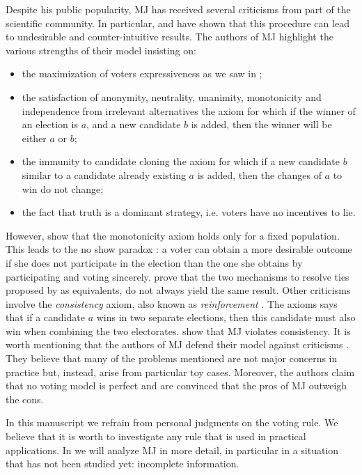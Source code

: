 Despite his public popularity, \ac{MJ} has received several criticisms from part of the scientific community. In particular, \citet{Felsenthal2008, Zahid2009} and \citet{Laslier2018} have shown that this procedure can lead to undesirable and counter-intuitive results.
The authors of \ac{MJ} highlight the various strengths of their model insisting on:
\begin{itemize}
	\item the maximization of voters expressiveness \textemdash as we saw in ;
	\item the satisfaction of anonymity, neutrality, unanimity, monotonicity and independence from irrelevant alternatives \textemdash the axiom for which if the winner of an election is $a$, and a new candidate $b$ is added, then the winner will be either $a$ or $b$;
	\item the immunity to candidate cloning \textemdash the axiom for which if a new candidate $b$ similar to a candidate already existing $a$ is added, then the changes of $a$ to win do not change;
	\item the fact that truth is a dominant strategy, i.e. voters have no incentives to lie. 
\end{itemize}

However, \citet{Felsenthal2008,Laslier2018} show that the monotonicity axiom holds only for a fixed population. This leads to the no show paradox \citep{Fishburn1983}: a voter can obtain a more desirable outcome if she does not participate in the election than the one she obtains by participating and voting sincerely. 
\citet{Felsenthal2008,Zahid2009} prove that the two mechanisms to resolve ties proposed by \citet{Balinski2011} as equivalents, do not always yield the same result. 
Other criticisms involve the \textit{consistency} axiom, also known as \textit{reinforcement} \citep{Young1974,Young1975}. The axioms says that if a candidate $a$ wins in two separate elections, then this candidate must also win when combining the two electorates. \citet{Felsenthal2008} show that \ac{MJ} violates consistency.
It is worth mentioning that the authors of \ac{MJ} defend their model against criticisms \citep{Balinski2011,Balinski2019}. They believe that many of the problems mentioned are not major concerns in practice but, instead, arise from particular toy cases. Moreover, the authors claim that no voting model is perfect and are convinced that the pros of MJ outweigh the cons.

In this manuscript we refrain from personal judgments on the voting rule. We believe that it is worth to investigate any rule that is used in practical applications. In  we will analyze \ac{MJ} in more detail, in particular in a situation that has not been studied yet: incomplete information.









